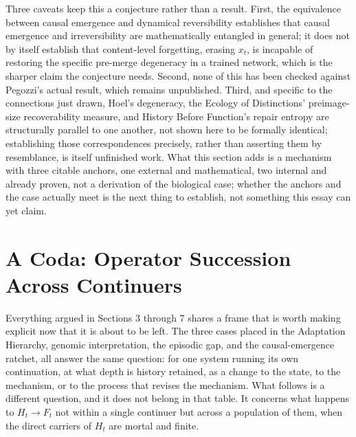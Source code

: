 \documentclass[11pt]{article}
\begin{document}
Three caveats keep this a conjecture rather than a result. First, the equivalence between causal emergence and dynamical reversibility establishes that causal emergence and irreversibility are mathematically entangled in general; it does not by itself establish that content-level forgetting, erasing $x_t$, is incapable of restoring the specific pre-merge degeneracy in a trained network, which is the sharper claim the conjecture needs. Second, none of this has been checked against Pegozzi's actual result, which remains unpublished. Third, and specific to the connections just drawn, Hoel's degeneracy, the Ecology of Distinctions' preimage-size recoverability measure, and History Before Function's repair entropy are structurally parallel to one another, not shown here to be formally identical; establishing those correspondences precisely, rather than asserting them by resemblance, is itself unfinished work. What this section adds is a mechanism with three citable anchors, one external and mathematical, two internal and already proven, not a derivation of the biological case; whether the anchors and the case actually meet is the next thing to establish, not something this essay can yet claim.

\section{A Coda: Operator Succession Across Continuers}

Everything argued in Sections 3 through 7 shares a frame that is worth making explicit now that it is about to be left. The three cases placed in the Adaptation Hierarchy, genomic interpretation, the episodic gap, and the causal-emergence ratchet, all answer the same question: for one system running its own continuation, at what depth is history retained, as a change to the state, to the mechanism, or to the process that revises the mechanism. What follows is a different question, and it does not belong in that table. It concerns what happens to $H_t \to F_t$ not within a single continuer but across a population of them, when the direct carriers of $H_t$ are mortal and finite.
\end{document}
